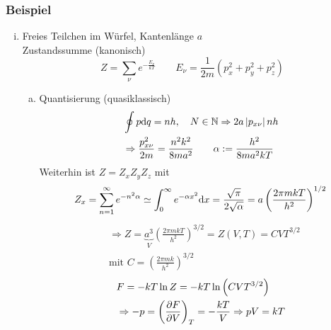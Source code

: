 \subsubsection{Beispiel}
\begin{enumerate}[i)]
    \item Freies Teilchen im Würfel, Kantenlänge $a$ \\
    Zustandssumme (kanonisch)
    \begin{equation}
        Z = \sum_\nu e^{- \frac{E_\nu}{k T}} \qquad E_\nu = \frac{1}{2 m} \left( p_x^2 + p_y^2 + p_z^2 \right)
    \end{equation}
    \begin{enumerate}[a)]
        \item Quantisierung (quasiklassisch)
        \begin{equation}
            \begin{split}
                & \oint p \mathrm{d} q = n h, \quad N \in \mathbb{N} \Rightarrow 2 a \left| p_{x \nu}  \right| n h \\
                & \Rightarrow \frac{p_{x \nu}^2}{2 m} = \frac{n^2 k^2}{8 m a^2} \qquad \alpha := \frac{h^2}{8 m a^2 k T}
            \end{split}
        \end{equation}
        Weiterhin ist $Z = Z_x Z_y Z_z$ mit
        \begin{equation}
            Z_x = \sum_{n=1}^{\infty} e^{-n^2 \alpha} \simeq \int_{0}^{\infty} e^{-\alpha x^2} \mathrm{d} x
            = \frac{\sqrt{\pi}}{2 \sqrt{\alpha}} = a \left( \frac{2 \pi m k T}{h^2} \right)^{1/2}
        \end{equation}
        \begin{equation}
            \begin{split}
                & \Rightarrow Z = \underbrace{a^3}_{V} \left( \frac{2 \pi m k T}{h^2} \right)^{3/2} = Z(V, T) = C V T^{3/2} \\
                & \text{mit } C = \left( \frac{2 \pi m k }{h^2} \right)^{3/2}
            \end{split}
        \end{equation}
        \begin{equation}
            \begin{split}
                & F = - k T \ln Z = - k T \ln \left( C V T^{3/2} \right) \\
                & \Rightarrow - p = \pdi{F}{V}{T} = - \frac{k T}{V} \Rightarrow p V = k T
            \end{split}

\end{equation}
\end{enumerate}
\end{enumerate}
